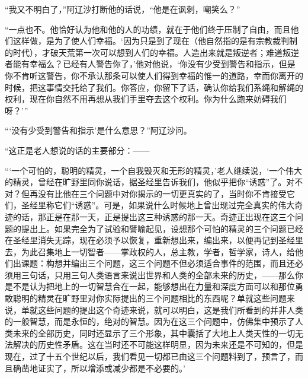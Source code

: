 \par “我又不明白了，”阿辽沙打断他的话说，“他是在讽刺，嘲笑么？”
\par “一点也不。他恰好认为他和他的人的功绩，就在于他们终于压制了自由，而且他们这样做，是为了使人们幸福。‘因为只是到了现在（他自然指的是有宗教裁判制的时代），才破天荒第一次可以想到人们的幸福。人造出来就是叛逆者；难道叛逆者能有幸福么？已经有人警告你了，’他对他说，‘你没有少受到警告和指示，但是你不肯听这警告，你不承认那条可以使人们得到幸福的惟一的道路，幸而你离开的时候，把这事情交托给了我们。你答应，你留下了话，确认你给我们系绳和解绳的权利，现在你自然不用再想从我们手里夺去这个权利。你为什么跑来妨碍我们呀？’”
\par “‘没有少受到警告和指示’是什么意思？”阿辽沙问。
\par “这正是老人想说的话的主要部分：——
\par “‘一个可怕的，聪明的精灵，一个自我毁灭和无形的精灵，’老人继续说，‘一个伟大的精灵，曾经在旷野里同你说话，据圣经里告诉我们，他似乎把你“诱惑”了。对不对？但再没有比他在三个问题中对你揭示的一切更真实的了，当时你不肯接受它们，圣经里称它们“诱惑”。可是，如果说什么时候地上曾出现过完全真实的伟大奇迹的话，那正是在那一天，正是提出这三种诱惑的那一天。奇迹正出现在这三个问题的提出上。如果完全为了试验和譬喻起见，设想那个可怕的精灵的三个问题已经在圣经里消失无踪，现在必须予以恢复，重新想出来，编出来，以便再记到圣经里去，为此召集地上一切智者——掌政权的人，总主教，学者，哲学家，诗人，给他们出课题：构想并编出三个问题，这三个问题不但必须适合事件的范围，而且还必须用三句话，只用三句人类语言来说出世界和人类的全部未来的历史，——那么你是不是认为把地上的一切智慧合在一起，能够想出在力量和深度方面可以和那位勇敢聪明的精灵在旷野里对你实际提出的三个问题相比的东西呢？单就这些问题来说，单就这些问题的提出这个奇迹来说，就可以明白，这是我们所看到的并非人类的一般智慧，而是永恒的，绝对的智慧。因为在这三个问题中，仿佛集中预示了人类未来的全部历史，同时还显示了三个形象，其中囊括了大地上人类天性的一切无法解决的历史性矛盾。这在当时还不可能这样明显，因为未来还是不可知的，但是现在，过了十五个世纪以后，我们看见一切都已由这三个问题料到了，预言了，而且确凿地证实了，所以增添或减少都是不必要的。’
